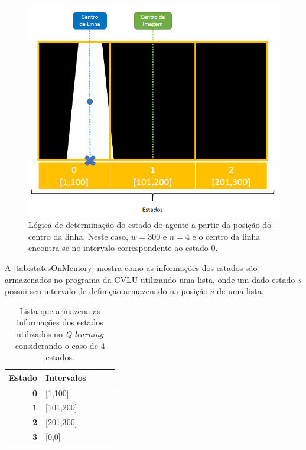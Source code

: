 \documentclass[a4paper]{ifacconf}
\begin{document}
\begin{figure}
\centering 
\caption{Lógica de determinação do estado do agente a partir da posição do centro da linha. Neste caso, $w = 300$ e $n = 4$ e o centro da linha encontra-se no intervalo correspondente ao estado 0.} \label{fig:stateDefinitionSystem}
\includegraphics[scale=0.55]{Figuras/stateDefinitionSystem.png}
\end{figure} 

A \autoref{tab:statesOnMemory} mostra como as informações dos estados são armazenados no programa da CVLU utilizando uma lista, onde um dado estado $s$ possui seu intervalo de definição armazenado na posição $s$ de uma lista.

\begin{table}
\centering
\ABNTEXfontereduzida
\caption{Lista que armazena as informações dos estados utilizados no \textit{Q-learning} considerando o caso de 4 estados.} \label{tab:statesOnMemory}
\begin{tabular}{r|p{2cm}|p{2cm}|p{2cm}|p{2cm}}
\textbf{Estado} & Intervalos\\ \hline
\textbf{0} & [1,100]\\
\textbf{1} & [101,200]\\
\textbf{2} & [201,300] \\
\textbf{3} & [0,0]\\

\end{tabular}
\end{table}
\end{document}
